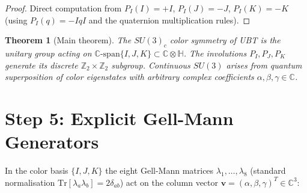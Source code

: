 \documentclass[12pt,a4paper]{article}
\newtheorem{theorem}{Theorem}[section]
\theoremstyle{definition}
\theoremstyle{remark}
\begin{document}
\begin{proof}
Direct computation from $P_I(I) = +I$, $P_I(J) = -J$, $P_I(K) = -K$ (using
$P_I(q) = -IqI$ and the quaternion multiplication rules).
\end{proof}

\begin{theorem}[Main theorem]
\label{thm:main}
\emph{The $SU(3)_c$ color symmetry of UBT is the unitary group acting on
$\mathbb{C}\text{-span}\{I, J, K\} \subset \mathbb{C}\otimes\mathbb{H}$.
The involutions $P_I, P_J, P_K$ generate its discrete $\mathbb{Z}_2
\times \mathbb{Z}_2$ subgroup.  Continuous $SU(3)$ arises from quantum
superposition of color eigenstates with arbitrary complex coefficients
$\alpha, \beta, \gamma \in \mathbb{C}$.}
\end{theorem}

\section{Step 5: Explicit Gell-Mann Generators}
\label{sec:generators}

In the color basis $\{I, J, K\}$ the eight Gell-Mann matrices
$\lambda_1, \ldots, \lambda_8$ (standard normalisation
$\mathrm{Tr}[\lambda_a \lambda_b] = 2\delta_{ab}$) act on the column vector
$\mathbf{v} = (\alpha, \beta, \gamma)^T \in \mathbb{C}^3$:
\end{document}
